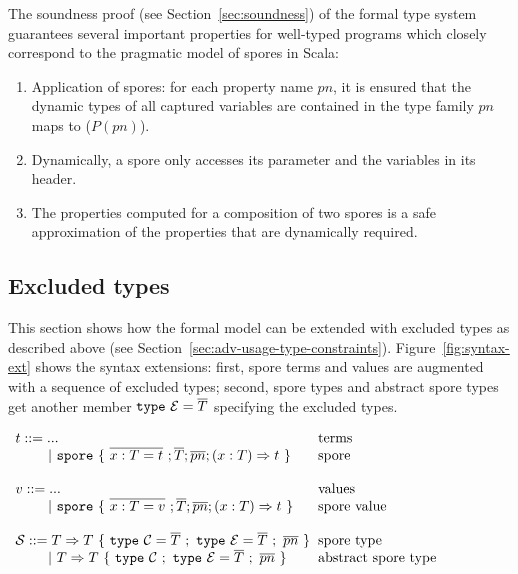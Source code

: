 The soundness proof (see Section~\ref{sec:soundness}) of the formal type system guarantees several important properties for well-typed programs which closely correspond to the pragmatic model of spores in Scala:

\begin{enumerate}

\item Application of spores: for each property name $pn$, it is ensured that the dynamic types of all captured variables are contained in the type family $pn$ maps to ($P(pn)$).

\item Dynamically, a spore only accesses its parameter and the variables in its header.

\item The properties computed for a composition of two spores is a safe approximation of the properties that are dynamically required.

\end{enumerate}


\subsection{Excluded types}

This section shows how the formal model can be extended with excluded types as described above (see Section~\ref{sec:adv-usage-type-constraints}). Figure~\ref{fig:syntax-ext} shows the syntax extensions: first, spore terms and values are augmented with a sequence of excluded types; second, spore types and abstract spore types get another member $\texttt{type}~\mathcal{E} = \overline{T}$ specifying the excluded types.

\begin{figure*}[ht!]
  \centering

  $\ba[t]{l@{\hspace{2mm}}l}
t ::=     ...                               & \mbox{terms}
\\
\gap ~|~  \texttt{spore}~\{~\seq{x : T = t}~; \seq{T}; \seq{pn} ; (x: T) \Rightarrow t~\}  & \mbox{spore}
\\
 & \\
v ::=     ...                               & \mbox{values}
\\
\gap ~|~  \texttt{spore}~\{~\seq{x : T = v}~; \seq{T}; \seq{pn} ; (x: T) \Rightarrow t~\}  & \mbox{spore value}
\\
 & \\
\mathcal{S} ::= T \Rightarrow T~\{~\texttt{type}~\mathcal{C} = \seq{T}~;~\texttt{type}~\mathcal{E} = \seq{T}~;~\seq{pn}~\}   & \mbox{spore type}
\\
\gap ~|~  T \Rightarrow T~\{~\texttt{type}~\mathcal{C}~;~\texttt{type}~\mathcal{E} = \seq{T}~;~\seq{pn}~\}   & \mbox{abstract spore type}
\\
\ea$

  \caption{Core language syntax extensions}
  \label{fig:syntax-ext}
\end{figure*}

